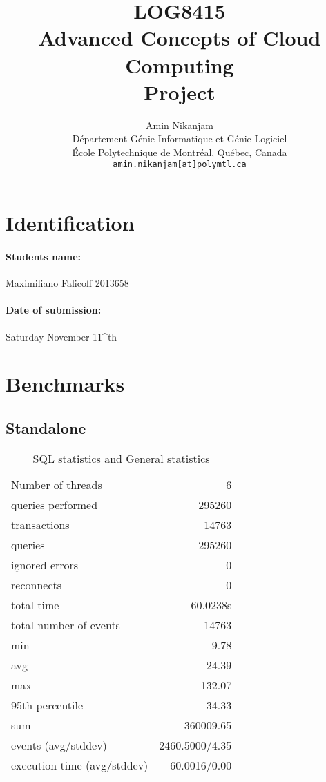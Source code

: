\documentclass[11pt]{article}
\title{LOG8415\\Advanced Concepts of Cloud Computing\\Project}
\author{
    Amin Nikanjam \\
    D\'{e}partement G\'{e}nie Informatique et G\'{e}nie Logiciel \\
    \'{E}cole Polytechnique de Montr\'{e}al, Qu\'{e}bec, Canada \\
    \texttt{amin.nikanjam[at]polymtl.ca} \\
}
\date{}
\def\auteur{}
\begin{document}
\maketitle

\section{Identification}

\paragraph{Students name:} Maximiliano Falicoff 2013658
\auteur

\paragraph{Date of submission:} Saturday November 11^{th} 

\section{Benchmarks}
\subsection{Standalone}

\begin{table}[H]
\centering
\begin{tabular}{ l r }
\hline
Number of threads & 6 \\
queries performed & 295260 \\
transactions & 14763 \\
queries & 295260 \\
ignored errors & 0 \\
reconnects & 0 \\
total time & 60.0238s \\
total number of events & 14763 \\
min & 9.78 \\
avg & 24.39 \\
max & 132.07 \\
95th percentile & 34.33 \\
sum & 360009.65 \\
events (avg/stddev) & 2460.5000/4.35 \\
execution time (avg/stddev) & 60.0016/0.00 \\
\hline
\end{tabular}
\caption{SQL statistics and General statistics}
\label{tab:table1}
\end{table}
\end{document}

